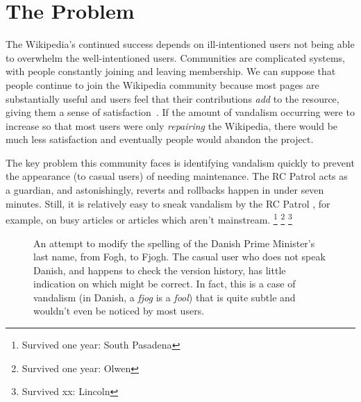 \section{The Problem}

The Wikipedia's continued success depends on ill-intentioned users
not being able to overwhelm the well-intentioned users.
Communities are complicated systems, with people constantly joining and
leaving membership.
We can suppose that people continue to
join the Wikipedia community because most pages are
substantially useful and users feel that their contributions
\textit{add} to the resource,
giving them a sense of satisfaction~\cite{Benkler2002}.
If the amount of vandalism occurring were to increase so that
most users were only \textit{repairing} the Wikipedia, there
would be much less satisfaction and eventually people would
abandon the project.

The key problem this community faces is identifying vandalism
quickly to prevent the appearance (to casual users)
 of needing maintenance.
The RC Patrol acts as a guardian, and astonishingly, reverts and
rollbacks happen in under seven minutes.
Still, it is relatively easy to sneak vandalism by the
RC Patrol ,
for example, on busy articles or articles which aren't mainstream.
\footnote{Survived one year: South Pasadena}
\footnote{Survived one year: Olwen}
\footnote{Survived xx: Lincoln}



\begin{figure}[t]
\centering
{}
\hspace{1ex}
\caption{An attempt to modify the
  spelling of the Danish Prime Minister's last name, from Fogh, to Fjogh.
  The casual user who does not speak Danish, and happens to check
  the version history, has little indication on which might be correct.
  In fact, this is a case of vandalism
  (in Danish, a \textit{fjog} is a \textit{fool})
  that is quite subtle and wouldn't even be noticed by most users.}
\label{fig-denmark}
\end{figure}


